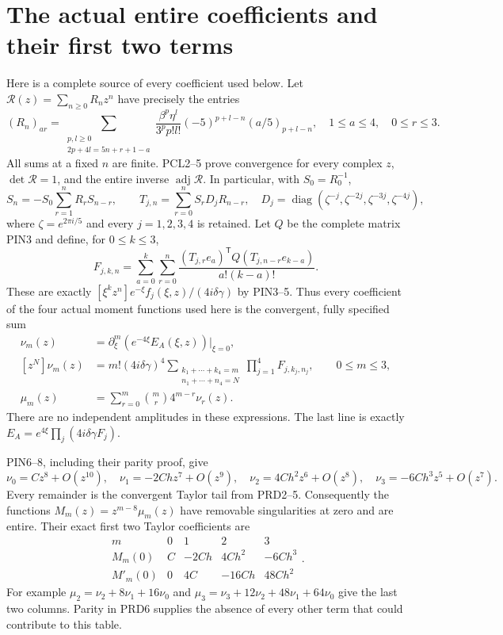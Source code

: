 \documentclass[11pt]{article}
\begin{document}
\section{The actual entire coefficients and their first two terms}
Here is a complete source of every coefficient used below. Let
$\mathcal R(z)=\sum_{n\ge0}R_nz^n$ have precisely the entries
\[
 (R_n)_{a r}=
 \sum_{\substack{p,l\ge0\\2p+4l=5n+r+1-a}}
 \frac{\beta^p\eta^l}{3^p p!l!}
 (-5)^{p+l-n}(a/5)_{p+l-n},
 \quad 1\le a\le4,\quad0\le r\le3.
 \tag{PRD2}
\]
All sums at a fixed $n$ are finite. PCL2--5 prove convergence
for every complex $z$, $\det\mathcal R=1$, and the entire
inverse $\operatorname{adj}\mathcal R$. In particular, with
$S_0=R_0^{-1}$,
\[
 S_n=-S_0\sum_{r=1}^nR_rS_{n-r},\qquad
 T_{j,n}=\sum_{r=0}^nS_rD_jR_{n-r},\quad
 D_j=\operatorname{diag}(\zeta^{-j},\zeta^{-2j},
                           \zeta^{-3j},\zeta^{-4j}),
 \tag{PRD3}
\]
where $\zeta=e^{2\pi i/5}$ and every $j=1,2,3,4$ is retained.
Let $Q$ be the complete matrix PIN3 and define, for $0\le k\le3$,
\[
 F_{j,k,n}=
 \sum_{a=0}^k\sum_{r=0}^n
 \frac{(T_{j,r}e_a)^{\mathsf T}Q(T_{j,n-r}e_{k-a})}
 {a!(k-a)!}.
 \tag{PRD4}
\]
These are exactly $[\xi^kz^n]e^{-\xi}f_j(\xi,z)/(4i\delta\gamma)$
by PIN3--5. Thus every coefficient of the four actual moment
functions used here is the convergent, fully specified sum
\[
\begin{split}
 \nu_m(z)&=\partial_\xi^m(e^{-4\xi}E_A(\xi,z))\big|_{\xi=0},\\
 [z^N]\nu_m(z)&=m!(4i\delta\gamma)^4
 \sum_{\substack{k_1+\cdots+k_4=m\\n_1+\cdots+n_4=N}}
          \prod_{j=1}^4F_{j,k_j,n_j},\qquad0\le m\le3,\\
 \mu_m(z)&=\sum_{r=0}^m\binom mr4^{m-r}\nu_r(z).
\end{split}\tag{PRD5}
\]
There are no independent amplitudes in these expressions.
The last line is exactly $E_A=e^{4\xi}\prod_j(4i\delta\gamma F_j)$.

PIN6--8, including their parity proof, give
\[
 \nu_0=Cz^8+O(z^{10}),\quad
 \nu_1=-2Chz^7+O(z^9),\quad
 \nu_2=4Ch^2z^6+O(z^8),\quad
 \nu_3=-6Ch^3z^5+O(z^7).
 \tag{PRD6}
\]
Every remainder is the convergent Taylor tail from PRD2--5.
Consequently the functions $M_m(z)=z^{m-8}\mu_m(z)$ have
removable singularities at zero and are entire. Their exact first
two Taylor coefficients are
\[
\begin{array}{c|rrrr}
 m&0&1&2&3\\\hline
 M_m(0)&C&-2Ch&4Ch^2&-6Ch^3\\
 M'_m(0)&0&4C&-16Ch&48Ch^2
\end{array}.
\tag{PRD7}
\]
For example $\mu_2=\nu_2+8\nu_1+16\nu_0$ and
$\mu_3=\nu_3+12\nu_2+48\nu_1+64\nu_0$ give the last
two columns. Parity in PRD6 supplies the absence of every other
term that could contribute to this table.
\end{document}
